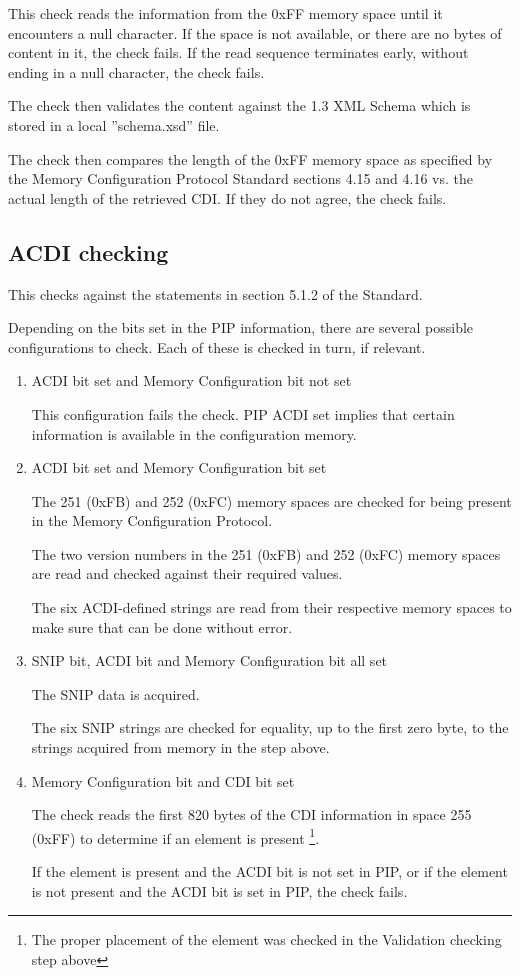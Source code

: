This check reads the information from the 0xFF memory space
until it encounters a null character.
If the space is not available, or there are no bytes of content in it, the check fails.
If the read sequence terminates early, without ending in a null character, the check fails.
 
The check then validates the content against the 1.3 XML Schema
which is stored in a local ”schema.xsd” file.

The check then compares the length of the 0xFF memory space 
as specified by the Memory Configuration Protocol Standard sections 4.15 and 4.16
vs. the actual length of the retrieved CDI.
If they do not agree, the check fails.

\subsection{ACDI checking}

This checks against the statements in section 5.1.2 of the Standard.

Depending on the bits set in the PIP information, there are several 
possible configurations to check. Each of these is checked in turn, if relevant.

\begin{enumerate}

\item ACDI bit set and Memory Configuration bit not set

This configuration fails the check.  PIP ACDI set implies that certain information 
is available in the configuration memory.

\item ACDI bit set and Memory Configuration bit set

The 251 (0xFB) and 252 (0xFC) memory spaces are checked for
being present in the Memory Configuration Protocol.

The two version numbers in the 251 (0xFB) and 252 (0xFC) memory spaces
are read and checked against their required values.

The six ACDI-defined strings are read from their respective memory spaces
to make sure that can be done without error.

\item SNIP bit, ACDI bit and Memory Configuration bit all set

The SNIP data is acquired.
 
The six SNIP strings are checked for equality, up to the first zero byte, to the
strings acquired from memory in the step above.

\item Memory Configuration bit and CDI bit set

The check reads the first 820 bytes of the CDI information in space 255 (0xFF) to 
determine if an  element is present
\footnote{The proper placement of the  element was checked in the Validation 
checking step above}.  

If the  element is present and the ACDI bit is not set in PIP, or
if the  element is not present and the ACDI bit is set in PIP,
the check fails.

\end{enumerate}

